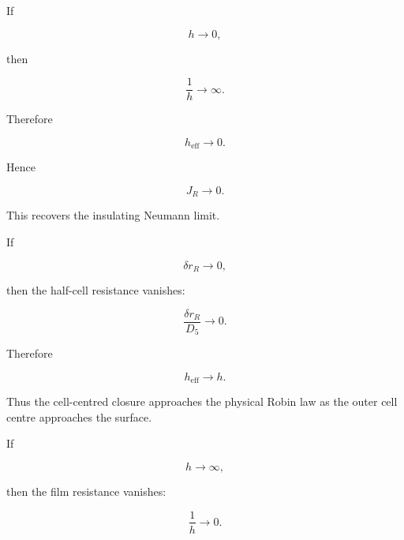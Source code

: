 \documentclass[11pt,a4paper]{article}
\begin{document}
If

\begin{equation}
h\to0,
\tag{TRISO-FV-204}
\label{eq:triso-fv-204}
\end{equation}

then

\begin{equation}
\frac1h\to\infty.
\tag{TRISO-FV-205}
\label{eq:triso-fv-205}
\end{equation}

Therefore

\begin{equation}
h_{\mathrm{eff}}\to0.
\tag{TRISO-FV-206}
\label{eq:triso-fv-206}
\end{equation}

Hence

\begin{equation}
J_R\to0.
\tag{TRISO-FV-207}
\label{eq:triso-fv-207}
\end{equation}

This recovers the insulating Neumann limit.

If

\begin{equation}
\delta r_R\to0,
\tag{TRISO-FV-208}
\label{eq:triso-fv-208}
\end{equation}

then the half-cell resistance vanishes:

\begin{equation}
\frac{\delta r_R}{D_5}\to0.
\tag{TRISO-FV-209}
\label{eq:triso-fv-209}
\end{equation}

Therefore

\begin{equation}
h_{\mathrm{eff}}\to h.
\tag{TRISO-FV-210}
\label{eq:triso-fv-210}
\end{equation}

Thus the cell-centred closure approaches the physical Robin law as the outer cell centre approaches the surface.

If

\begin{equation}
h\to\infty,
\tag{TRISO-FV-211}
\label{eq:triso-fv-211}
\end{equation}

then the film resistance vanishes:

\begin{equation}
\frac1h\to0.
\tag{TRISO-FV-212}
\label{eq:triso-fv-212}
\end{equation}
\end{document}
